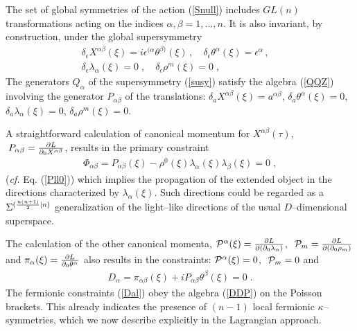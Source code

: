 \documentclass[a4paper,11pt]{article}
\begin{document}
The set of global symmetries of the action  (\ref{Snull}) includes 
$GL(n)$ transformations acting on the indices $\alpha, \beta = 1,\ldots , n$. 
It is also invariant, by construction, under the global supersymmetry 
\begin{eqnarray}\label{susy} 
\delta_{\epsilon} X^{\alpha\beta}(\xi) = i\epsilon^{(\alpha}\theta^{\beta )}(\xi)\, , \quad \delta_{\epsilon} \theta^{\alpha}(\xi)= \epsilon^{\alpha}
\, , \quad \\ \nonumber 
\delta_{\epsilon} \lambda_{\alpha}(\xi)=0\; , \quad 
\delta_{\epsilon} \rho^m (\xi)=0\; , 
\end{eqnarray} 
The generators $Q_\alpha$ of the supersymmetry (\ref{susy}) 
 satisfy the algebra (\ref{QQZ}) involving the generator $P_{\alpha\beta}$  
of the translations: $\delta_{a} X^{\alpha\beta}(\xi )= a^{\alpha\beta}$, 
$\delta_{a} \theta^{\alpha}(\xi)=0$, $\delta_{a} \lambda_{\alpha}(\xi)=0$, 
$\delta_{a} \rho^m (\xi)=0$. 


A straightforward calculation of canonical momentum for 
$X^{\alpha\beta}(\tau)$, 
$\; P_{\alpha\beta}= {\partial L \over \partial_0 X^{\alpha\beta}}$, 
results in the primary constraint 
\begin{eqnarray}\label{Pllp} 
\Phi_{\alpha\beta}= P_{\alpha\beta}(\xi)  - 
\rho^0 (\xi) \lambda_{\alpha}(\xi)\lambda_{\beta}(\xi)= 0 \; ,  
\end{eqnarray}
({\it cf.} Eq. (\ref{Pll0}))
which implies the propagation of the extended object in the 
directions characterized by 
$\lambda_{\alpha}(\xi)$. Such directions could be regarded as a 
$\Sigma^{({n(n+1)\over 2}|n)}$ 
generalization of the light--like directions of the usual $D$--dimensional 
superspace. 

The calculation of the other canonical momenta, ${\cal P}^\alpha (\xi) =  
{\partial L \over \partial (\partial_0 \lambda_{\alpha})}$, 
$\; {\cal P}_m =  {\partial L \over \partial (\partial_0 \rho_m)}$ and 
$\pi_\alpha (\xi) =  {\partial L \over \partial_0 \theta^{\alpha}}$ also 
results in the constraints: ${\cal P}^\alpha (\xi) =0$, 
$\; {\cal P}_m =0$ and 
\begin{eqnarray}\label{Dal} 
D_{\alpha}= \pi_{\alpha\beta}(\xi)  + i P_{\alpha\beta}
\theta^{\beta}(\xi)= 0 \; .   
\end{eqnarray}
The fermionic constraints (\ref{Dal})  
 obey the algebra (\ref{DDP}) on the Poisson brackets. 
This already indicates the presence of 
$(n-1)$ local fermionic $\kappa$--symmetries, which we now 
describe explicitly in the Lagrangian approach. 
  
\end{document}
